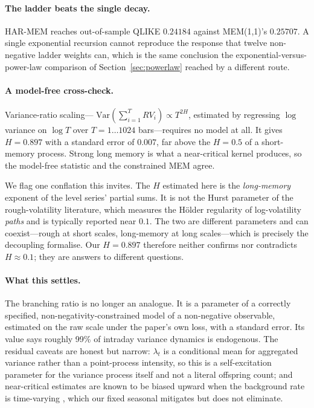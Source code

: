 \paragraph{The ladder beats the single decay.} HAR-MEM reaches out-of-sample
QLIKE $0.24184$ against MEM(1,1)'s $0.25707$. A single exponential recursion
cannot reproduce the response that twelve non-negative ladder weights can,
which is the same conclusion the exponential-versus-power-law comparison of
Section~\ref{sec:powerlaw} reached by a different route.

\paragraph{A model-free cross-check.} Variance-ratio scaling---
$\mathrm{Var}(\sum_{i=1}^{T} RV_i) \propto T^{2H}$, estimated by regressing
$\log$ variance on $\log T$ over $T = 1 \ldots 1024$ bars---requires no model
at all. It gives $H = 0.897$ with a standard error of $0.007$, far above the
$H = 0.5$ of a short-memory process. Strong long memory is what a near-critical
kernel produces, so the model-free statistic and the constrained MEM agree.

We flag one conflation this invites. The $H$ estimated here is the
\emph{long-memory} exponent of the level series' partial sums. It is not the
Hurst parameter of the rough-volatility literature, which measures the
H\"older regularity of log-volatility \emph{paths} and is typically reported
near $0.1$. The two are different parameters and can coexist---rough at short
scales, long-memory at long scales---which is precisely the decoupling
\citet{BennedsenLundePakkanen2022} formalise. Our $H = 0.897$ therefore neither
confirms nor contradicts $H \approx 0.1$; they are answers to different
questions.

\paragraph{What this settles.} The branching ratio is no longer an analogue. It
is a parameter of a correctly specified, non-negativity-constrained model of a
non-negative observable, estimated on the raw scale under the paper's own loss,
with a standard error. Its value says roughly 99\% of intraday variance
dynamics is endogenous. The residual caveats are honest but narrow: $\lambda_t$
is a conditional mean for aggregated variance rather than a point-process
intensity, so this is a self-excitation parameter for the variance process
itself and not a literal offspring count; and near-critical estimates are known
to be biased upward when the background rate is time-varying
\citep{FilimonovSornette2012}, which our fixed seasonal mitigates but does not
eliminate.

